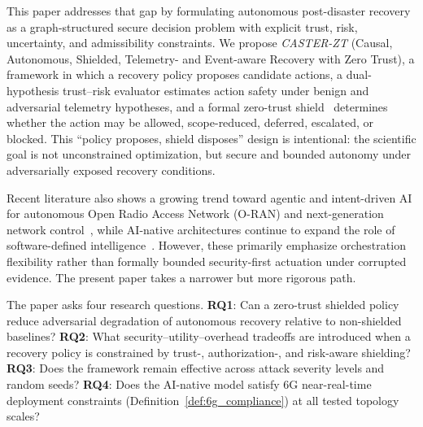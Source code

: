 \documentclass[10pt,journal,compsoc]{IEEEtran}
\begin{document}
This paper addresses that gap by formulating autonomous post-disaster recovery as a graph-structured secure decision problem with explicit trust, risk, uncertainty, and admissibility constraints.
We propose \emph{CASTER-ZT} (Causal, Autonomous, Shielded, Telemetry- and Event-aware Recovery with Zero Trust), a framework in which a recovery policy proposes candidate actions, a dual-hypothesis trust--risk evaluator estimates action safety under benign and adversarial telemetry hypotheses, and a formal zero-trust shield~\cite{rose2020nist} determines whether the action may be allowed, scope-reduced, deferred, escalated, or blocked.
This ``policy proposes, shield disposes'' design is intentional: the scientific goal is not unconstrained optimization, but secure and bounded autonomy under adversarially exposed recovery conditions.

Recent literature also shows a growing trend toward agentic and intent-driven AI for autonomous Open Radio Access Network (O-RAN) and next-generation network control~\cite{toward_autonomous_oran_2026}, while AI-native architectures continue to expand the role of software-defined intelligence~\cite{oran_official_architecture}.
However, these primarily emphasize orchestration flexibility rather than formally bounded security-first actuation under corrupted evidence.
The present paper takes a narrower but more rigorous path.

The paper asks four research questions.
\textbf{RQ1}: Can a zero-trust shielded policy reduce adversarial degradation of autonomous recovery relative to non-shielded baselines?
\textbf{RQ2}: What security--utility--overhead tradeoffs are introduced when a recovery policy is constrained by trust-, authorization-, and risk-aware shielding?
\textbf{RQ3}: Does the framework remain effective across attack severity levels and random seeds?
\textbf{RQ4}: Does the AI-native model satisfy 6G near-real-time deployment constraints (Definition~\ref{def:6g_compliance}) at all tested topology scales?
\end{document}
